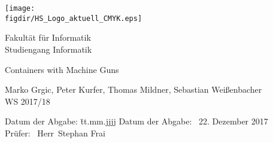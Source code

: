 \begin{titlepage}

\raggedleft

\vspace*{-2cm}

\texttt{[image: \\figdir/HS\_Logo\_aktuell\_CMYK.eps]}

\vfill

\centering
\LARGE
Fakultät für Informatik  \vspace{0.5cm}\\
\Large
Studiengang Informatik

\vspace{2cm}

\LARGE

Containers with Machine Guns
\vspace{2cm}

\Large
Marko Grgic, Peter Kurfer, Thomas Mildner, Sebastian Weißenbacher\\
WS 2017/18

\vspace{1.5cm}

\vspace{1cm}

\flushleft
 \Large
\vspace*{\fill}

\begin{tabbing}
Datum der Abgabe: \= tt.mm.jjjj \kill
Datum der Abgabe: \> \ 22. Dezember 2017 \\
Prüfer: \> \ Herr\ Stephan Frai\\
\end{tabbing}

\end{titlepage}

\cleardoubleemptypage

